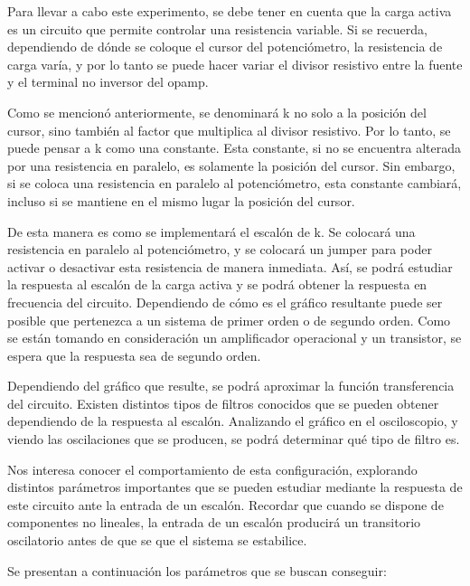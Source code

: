\documentclass[12pt,oneside,a4paper]{article}
\begin{document}
Para llevar a cabo este experimento, se debe tener en cuenta que la carga activa es un circuito 
que permite controlar una resistencia variable. Si se recuerda, dependiendo de dónde se coloque el 
cursor del potenciómetro, la resistencia de carga varía, y por lo tanto se puede hacer 
variar el divisor resistivo entre la fuente y el terminal no inversor del opamp. 

Como se mencionó anteriormente, se denominará k no solo a la posición del cursor, sino también al 
factor que multiplica al divisor resistivo. Por lo tanto, se puede pensar a k como una constante. 
Esta constante, si no se encuentra alterada por una resistencia en paralelo, es solamente la posición
del cursor. Sin embargo, si se coloca una resistencia en paralelo al potenciómetro, esta constante 
cambiará, incluso si se mantiene en el mismo lugar la posición del cursor.

De esta manera es como se implementará el escalón de k. Se colocará una resistencia en paralelo al 
potenciómetro, y se colocará un jumper para poder activar o desactivar esta resistencia de manera 
inmediata. Así, se podrá estudiar la respuesta al escalón de la carga activa y se podrá obtener la
respuesta en frecuencia del circuito. Dependiendo de cómo es el gráfico resultante puede ser posible
que pertenezca a un sistema de primer orden o de segundo orden. Como se están tomando en consideración 
un amplificador operacional y un transistor, se espera que la respuesta sea de segundo orden.

Dependiendo del gráfico que resulte, se podrá aproximar la función transferencia del circuito. 
Existen distintos tipos de filtros conocidos que se pueden obtener dependiendo de la respuesta al 
escalón. Analizando el gráfico en el osciloscopio, y viendo las oscilaciones que se producen, se 
podrá determinar qué tipo de filtro es. 

Nos interesa conocer el comportamiento de esta configuración, explorando distintos parámetros importantes 
que se pueden estudiar mediante la respuesta de este circuito ante la entrada de un escalón. Recordar 
que cuando se dispone de componentes no lineales, la entrada de un escalón producirá un transitorio 
oscilatorio antes de que se que el sistema se estabilice.

Se presentan a continuación los parámetros que se buscan conseguir:
\end{document}
